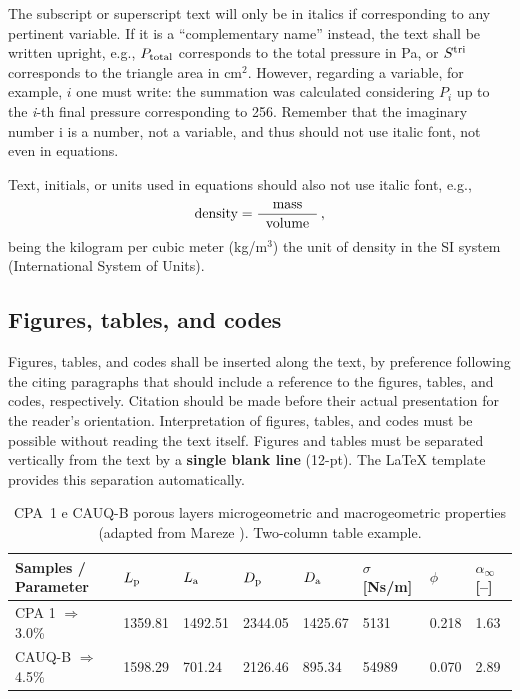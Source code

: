 \documentclass[12pt, a4paper, twoside, twocolumn]{article}
\begin{document}
The subscript or superscript text will only be in italics if corresponding to any pertinent variable. If it is a ``complementary name'' instead, the text shall be written upright, e.g., $P_{\text{total}}$ corresponds to the total pressure in Pa, or $S^{\text{tri}}$ corresponds to the triangle area in cm$^2$. However, regarding a variable, for example, $i$ one must write: the summation was calculated considering $P_i$ up to the \textit{i}-th final pressure corresponding to 256. Remember that the imaginary number i is a number, not a variable, and thus should not use italic font, not even in equations.

Text, initials, or units used in equations should also not use italic font, e.g.,
%
\begin{equation}
	\text{density} = \frac{\text{mass}}{\;\;\text{volume}\;\;}\,,
\label{eq:densidade}
\end{equation}
%
being the kilogram per cubic meter (kg/m$^3$) the unit of density in the SI system (International System of Units).

\subsection{Figures, tables, and codes}

Figures, tables, and codes shall be inserted along the text, by preference following the citing paragraphs that should include a reference to the figures, tables, and codes, respectively. Citation should be made before their actual presentation for the reader's orientation. Interpretation of figures, tables, and codes must be possible without reading the text itself. Figures and tables must be separated vertically from the text by a \textbf{single blank line} (12-pt). The \LaTeX{} template provides this separation automatically.

\begin{table}[!b]
  \centering {} 
  \caption{CPA~1 e CAUQ-B porous layers microgeometric and macrogeometric properties\\ (adapted from Mareze \etal \cite{Mareze-2017}). Two-column table example.}
	\fontsize{11}{12}\selectfont 
    \begin{tabular}{C{2.9cm} | C{1.5cm} | C{1.5cm} | C{1.5cm} | C{1.5cm} | C{1.5cm} | C{1.0cm}| C{1.0cm}}
    \toprule
    \textbf{ Samples / Parameter } & $L_{\text{p}}$ \qquad [$\upmu$\! m] & $L_{\text{a}}$ \qquad [$\upmu$\! m] & $D_{\text{p}}$ \qquad [$\upmu$\! m] & $D_{\text{a}}$ \qquad [$\upmu$\! m] & $\sigma$ [Ns/m] & {$\phi$\quad [--]} & $\alpha_{\infty}$ [--]\\
	  \midrule
		CPA 1 $\Rightarrow$  3.0\% &	1359.81 & 1492.51 & 2344.05 & 1425.67 &	5131 &	0.218 &	1.63\\
		 CAUQ-B $\Rightarrow$ 4.5\%	& 1598.29 &	701.24 & 2126.46 & 895.34 &	54989 &	0.070 &	2.89\\
    \bottomrule
    \end{tabular}
    \label{tab.exemplo}%
\end{table}%
\end{document}
